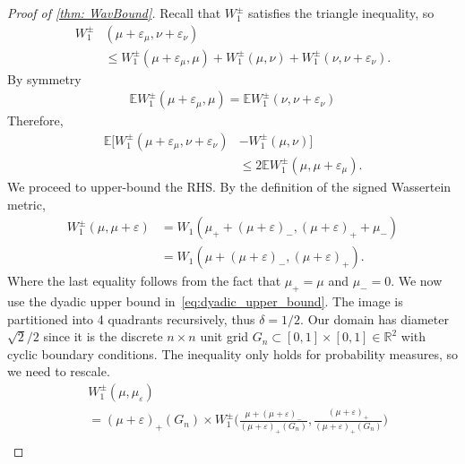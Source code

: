 \documentclass{article}
\theoremstyle{plain}
\theoremstyle{definition}
\theoremstyle{remark}
\begin{document}
\begin{proof}[Proof of \cref{thm: WavBound}]
Recall that $W_1^\pm $ satisfies the triangle inequality, so
\begin{align} \label{ineq:W1_noisedmunu_triangle}
    W_1^\pm &(\mu + \varepsilon_\mu,  \nu + \varepsilon_\nu)
    \\
    &\le
    W_1^\pm(\mu + \varepsilon_\mu, \mu)
    +
    W_1^\pm(\mu, \nu)
    +
    W_1^\pm(\nu, \nu + \varepsilon_\nu). \nonumber
\end{align}
By symmetry 
\begin{align}
    \mathbb{E}W_1^\pm(\mu + \varepsilon_\mu, \mu) = \mathbb{E}W_1^\pm(\nu, \nu + \varepsilon_\nu)
\end{align}
Therefore,
\begin{align}
    \mathbb{E}[W_1^\pm(\mu + \varepsilon_\mu,  \nu + \varepsilon_\nu) &- W_1^\pm(\mu, \nu)]
    \\&\le
    2\mathbb{E}W_1^\pm(\mu,  \mu + \varepsilon_\mu). \nonumber
\end{align}
We proceed to upper-bound the RHS.
By the definition of the signed Wassertein metric,
\begin{align}\label{eq: W1 pm decomposition}
    W_1^\pm(\mu, \mu + \varepsilon)
    &=
    W_1(\mu_+ + (\mu + \varepsilon)_-, (\mu + \varepsilon)_+ + \mu_-) \nonumber
    \\
    &=
    W_1(\mu + (\mu + \varepsilon)_-, (\mu + \varepsilon)_+).
\end{align}
Where the last equality follows from the fact that $\mu_+=\mu$ and $\mu_- = 0$.
We now use the dyadic upper bound in~\eqref{eq:dyadic_upper_bound}.
The image is partitioned into 4 quadrants recursively, thus $\delta =1/2$.
Our domain has diameter $\sqrt{2}/2$ since it is the discrete $n \times n$ unit grid $G_n \subset [0,1] \times [0,1] \in \mathbb{R}^2$ with cyclic boundary conditions.
The inequality only holds for probability measures, so we need to rescale.
\begin{align}
    &W_1^\pm  (\mu, \mu_\varepsilon) \\
    &= (\mu + \varepsilon)_+ (G_n) \times W_1^\pm\bigg( \frac{\mu + (\mu + \varepsilon)_-}{(\mu + \varepsilon)_+ (G_n)}, \frac{(\mu + \varepsilon)_+}{(\mu + \varepsilon)_+ (G_n)}\bigg) \nonumber \\

\end{align}
\end{proof}
\end{document}

